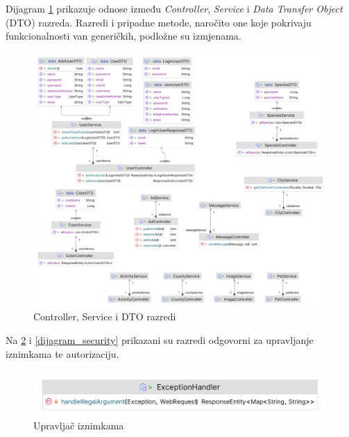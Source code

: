 			Dijagram \ref{dijagram_controller_service_dto} prikazuje odnose između \textit{Controller}, \textit{Service} i \textit{Data Transfer Object} (DTO) razreda. Razredi i pripadne metode, naročito one koje pokrivaju funkcionalnosti van generičkih, podložne su izmjenama.
			
			\begin{figure}[H]
				\includegraphics[scale=0.18]{slike/dijagram_controller_service_dto.PNG} 
				\centering
				\caption{Controller, Service i DTO razredi}
				\label{dijagram_controller_service_dto}
			\end{figure}
			
			Na \ref{dijagram_exception_handler} i \ref{dijagram_security} prikazani su razredi odgovorni za upravljanje iznimkama te autorizaciju.
			
			\begin{figure}[H]
				\includegraphics[scale=0.4]{slike/dijagram_exception_handler.PNG} 
				\centering
				\caption{Upravljač iznimkama}
				\label{dijagram_exception_handler}
			\end{figure}
			

